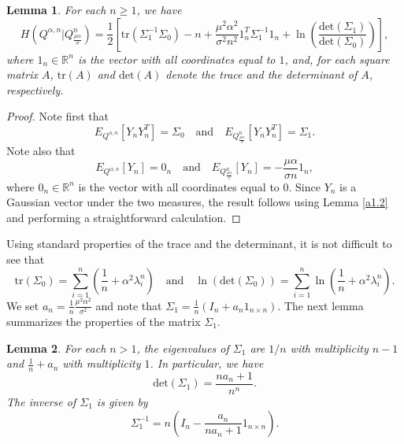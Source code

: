 \documentclass[reqno,a4paper]{amsart}
\theoremstyle{plain}
\theoremstyle{definition}
\theoremstyle{plain}
\newtheorem{lemma}{Lemma}
\theoremstyle{plain}
\theoremstyle{plain}
\begin{document}
\begin{lemma}\label{relent}
For each $n\geq 1$, we have
\begin{equation}\label{eg}
  H\left(Q^{\alpha,n}|Q_{\frac{\mu\alpha}{\sigma}}^n\right)=\frac{1}{2}\left[\textrm{tr}(\Sigma_1^{-1}\Sigma_0)-n+\frac{\mu^2\alpha^2}{\sigma^2 n^2} 1_n^T\Sigma_1^{-1}1_n+\ln\left(\frac{\textrm{det}\left(\Sigma_1\right)}{\textrm{det}\left(\Sigma_0\right)}\right)\right],
\end{equation}
where $1_n\in{{\mathbb R}}^n$  is the vector with all coordinates equal to $1$, and, for each square matrix $A$, $\textrm{tr}(A)$ and $\textrm{det}(A)$ denote the trace and the determinant of $A$, respectively.    
\end{lemma}
\begin{proof}
Note first that
 $$E_{Q^{\alpha,n}}\left[Y_nY_n^T\right]=\Sigma_0 \quad\textrm{and}\quad E_{Q_{\frac{\mu\alpha}{\sigma}}^n}\left[Y_nY_n^T\right]=\Sigma_1.$$
Note also that
$$E_{Q^{\alpha,n}}\left[Y_n\right]=0_n\quad\textrm{and}\quad E_{Q_{\frac{\mu\alpha}{\sigma}}^n}\left[Y_n\right]=-\frac{\mu\alpha}{\sigma n} 1_n,$$
where $0_n\in{{\mathbb R}}^n$ is the vector with all coordinates equal to $0$. Since $Y_n$ is a Gaussian vector under the two measures, the result follows using Lemma \ref{a1.2} and performing a straightforward calculation.
\end{proof}
Using standard properties of the trace and the determinant, it is not difficult to see that
\begin{equation}\label{trdet}
\textrm{tr}\left(\Sigma_0\right)=\sum\limits_{i=1}^n\left(\frac{1}{n}+\alpha^2\lambda_i^n\right)\quad\textrm{and}\quad\ln\left(\textrm{det}\left(\Sigma_0\right)\right)=\sum\limits_{i=1}^n\ln \left(\frac{1}{n}+\alpha^2\lambda_i^n\right).
\end{equation}
We set $a_n=\frac{1}{n}\frac{\mu^2\alpha^2}{\sigma^2}$ and note that $\Sigma_1=\frac{1}{n}(I_n+a_n1_{n\times n})$.
The next lemma summarizes the properties of the matrix $\Sigma_1$.
\begin{lemma}\label{linalg}
For each $n>1$, the eigenvalues of $\Sigma_1$ are $1/n$ with multiplicity $n-1$ and $\frac1{n}+a_n$ with multiplicity $1$. In particular, we have
$$\textrm{det}\left(\Sigma_1\right)=\frac{n a_n+1}{n^n}.$$
The inverse of $\Sigma_1$ is given by
$$\Sigma_1^{-1}=n\left(I_n-\frac{a_n}{n a_n+1}1_{n\times n}\right).$$
\end{lemma}
\end{document}
